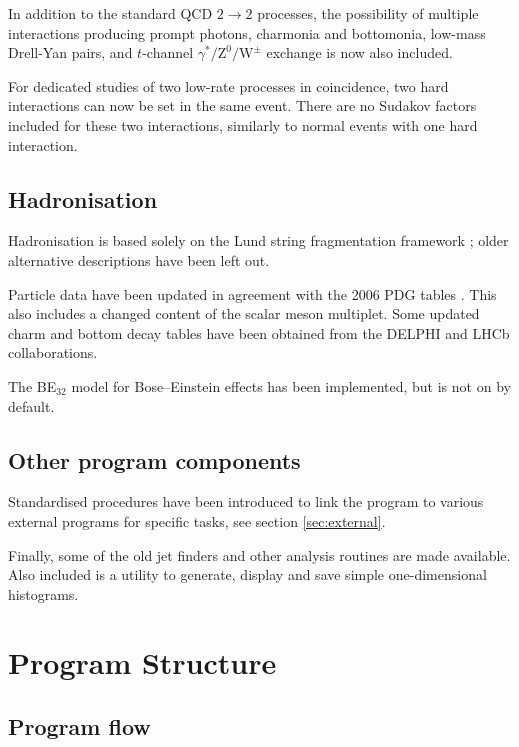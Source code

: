 \documentclass{elsartmod}
\begin{document}
In addition to the standard QCD $2 \to 2$ processes, the possibility
of multiple interactions producing prompt photons, charmonia and 
bottomonia, low-mass Drell-Yan pairs, and $t$-channel 
$\gamma^*/\mathrm{Z}^0/\mathrm{W}^{\pm}$ exchange is now also
included.

For dedicated studies of two low-rate processes in coincidence, two
hard interactions can now be set in the same event. There are no
Sudakov factors included for these two interactions, similarly to
normal events with one hard interaction.

\subsection{Hadronisation}

Hadronisation is based solely on the Lund string fragmentation
framework \cite{lundreview}; older alternative descriptions have 
been left out.

Particle data have been updated in agreement with the 2006 PDG
tables \cite{pdg}. This also includes a changed content of the scalar
meson multiplet. Some updated charm and bottom decay tables have been 
obtained from the DELPHI and LHCb collaborations.

The BE$_{32}$ model for Bose--Einstein effects \cite{boseeinstein} 
has been implemented, but is not on by default.  

\subsection{Other program components}

Standardised procedures have been introduced to link the program
to various external programs for specific tasks, see section 
\ref{sec:external}.

Finally, some of the old jet finders and other analysis routines are
made available. Also included is a utility to generate, display and 
save simple one-dimensional histograms.

\section{Program Structure \label{sec:structure}}

\subsection{Program flow}
\end{document}
